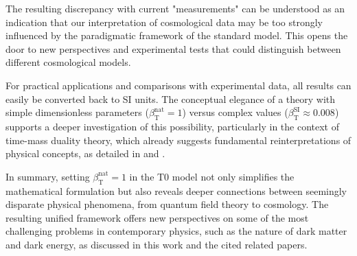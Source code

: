 \documentclass[12pt,a4paper]{article}
\newcommand{\betaT}{\beta_{\text{T}}}
\begin{document}
	The resulting discrepancy with current "measurements" can be understood as an indication that our interpretation of cosmological data may be too strongly influenced by the paradigmatic framework of the standard model. This opens the door to new perspectives and experimental tests that could distinguish between different cosmological models.
	
	For practical applications and comparisons with experimental data, all results can easily be converted back to SI units. The conceptual elegance of a theory with simple dimensionless parameters (\(\betaT^{\text{nat}} = 1\)) versus complex values (\(\betaT^{\text{SI}} \approx 0.008\)) supports a deeper investigation of this possibility, particularly in the context of time-mass duality theory, which already suggests fundamental reinterpretations of physical concepts, as detailed in \cite{pascher_zeit_masse_2025} and \cite{pascher_alphabeta_2025}.
	
	In summary, setting \(\betaT^{\text{nat}} = 1\) in the T0 model not only simplifies the mathematical formulation but also reveals deeper connections between seemingly disparate physical phenomena, from quantum field theory to cosmology. The resulting unified framework offers new perspectives on some of the most challenging problems in contemporary physics, such as the nature of dark matter and dark energy, as discussed in this work and the cited related papers.
	
\end{document}
